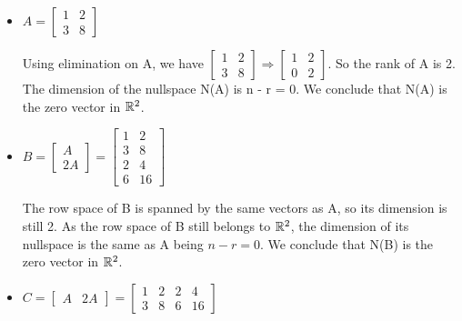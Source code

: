 \begin{itemize}
    \item \(A = \begin{bmatrix} 1 & 2 \\ 3 & 8 \end{bmatrix}\) \newline
    
    Using elimination on A, we have 
    \(\begin{bmatrix} 1 & 2 \\ 3 & 8 \end{bmatrix} \Longrightarrow \begin{bmatrix} 1 & 2 \\ 0 & 2 \end{bmatrix} \). So the rank of A is 2. The dimension of the nullspace N(A) is n - r = 0. We conclude that N(A) is the zero vector in \(\mathbb{R}^2\).
    
    
    \item\(B = \begin{bmatrix} A \\ 2A \end{bmatrix} = \begin{bmatrix} 1 & 2 \\ 3 & 8 \\ 2 & 4 \\ 6 & 16 \end{bmatrix}\) \newline
    
    The row space of B is spanned by the same vectors as A, so its dimension is still 2. As the row space of B still belongs to \(\mathbb{R}^2\), the dimension of its nullspace is the same as A being \(n - r = 0.\) We conclude that N(B) is the zero vector in \(\mathbb{R}^2\).
    
    
    \item\(C = \begin{bmatrix} A & 2A \end{bmatrix} = \begin{bmatrix} 1 & 2 & 2 & 4 \\ 3 & 8 & 6 & 16 \end{bmatrix}\) \newline
    

\end{itemize}
